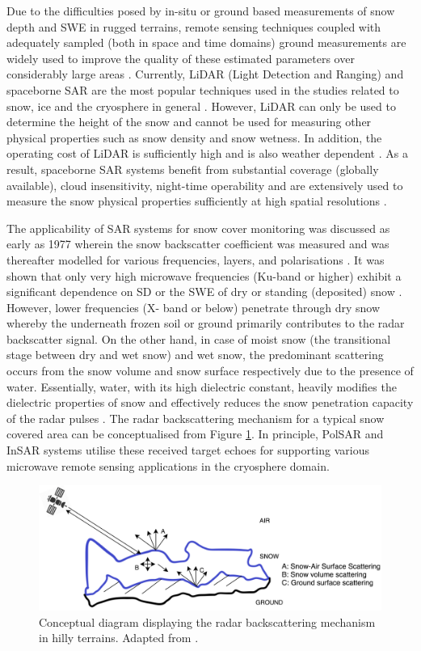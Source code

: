 \documentclass[review]{elsarticle}
\numberwithin{equation}{section}
\numberwithin{figure}{section}
\numberwithin{table}{section}
\begin{document}
Due to the difficulties posed by in-situ or ground based measurements of snow depth and SWE in rugged terrains, remote sensing techniques coupled with adequately sampled (both in space and time domains) ground measurements are widely used to improve the quality of these estimated parameters over considerably large areas \citep{Takala2011}. Currently, LiDAR (Light Detection and Ranging) and spaceborne SAR are the most popular techniques used in the studies related to snow, ice and the cryosphere in general \citep{Deems2013, Leinss2014, Tedesco2015}. However, LiDAR can only be used to determine the height of the snow and cannot be used for measuring other physical properties such as snow density and snow wetness. In addition, the operating cost of LiDAR is sufficiently high and is also weather dependent \citep{Deems2013}. As a result, spaceborne SAR systems benefit from substantial coverage (globally available), cloud insensitivity, night-time operability and are extensively used to measure the snow physical properties sufficiently at high spatial resolutions \citep{Moreira2013, Thakur2012}.

The applicability of SAR systems for snow cover monitoring was discussed as early as 1977 \citep{Ulaby1977} wherein the snow backscatter coefficient was measured and was thereafter modelled for various frequencies, layers, and polarisations \citep{Zuniga1979}. It was shown that only very high microwave frequencies (Ku-band or higher) exhibit a significant dependence on SD or the SWE of dry or standing (deposited) snow \citep{Yueh2009}. However, lower frequencies (X-
band or below) penetrate through dry snow whereby the underneath frozen soil or ground primarily contributes to the radar backscatter signal. On the other hand, in case of moist snow (the transitional stage between dry and wet snow) and wet snow, the predominant scattering occurs from the snow volume and snow surface respectively due to the presence of water. Essentially, water, with its high dielectric constant, heavily modifies the dielectric properties of snow and effectively reduces the snow penetration capacity of the radar pulses \citep{Abe1990}. The radar backscattering mechanism for a typical snow covered area can be conceptualised from Figure \ref{fig:concept}. In principle, PolSAR and InSAR systems utilise these received target echoes for supporting various microwave remote sensing applications in the cryosphere domain.

\begin{figure}[htb]
    \centering
    \includegraphics[width=\textwidth]{Figures/Conceptual.png}
    \caption{Conceptual diagram displaying the radar backscattering mechanism in hilly terrains. Adapted from \cite{Thakur2012}.}
    \label{fig:concept}
\end{figure}
\end{document}

